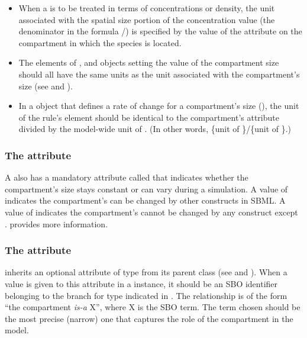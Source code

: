 \begin{itemize}
\item When a \Species is to be treated in terms of concentrations
  or density, the unit associated with the spatial size portion of
  the concentration value (\ie the denominator in the
  formula /) is specified by the
  value of the  attribute on the compartment in which
  the species is located.

\item The  elements of \AssignmentRule,
  \InitialAssignment and \EventAssignment objects setting the
  value of the compartment size should all have the same units as
  the unit associated with the compartment's size (see
  and ).

\item In a \RateRule object that defines a rate of change for a
  compartment's size (), the unit of the
  rule's  element should be identical to the
  compartment's  attribute divided by the model-wide
  unit of .  (In other words, \{unit of
  \}/\{unit of \}.)

\end{itemize}


\subsubsection{The  attribute}
\label{sec:compartment-constant}

A \Compartment also has a mandatory  attribute called
 that indicates whether the compartment's size
stays constant or can vary during a simulation.  A value of
 indicates the compartment's  can be
changed by other constructs in SBML.  A value of 
indicates the compartment's  cannot be changed by any
construct except \InitialAssignment.  
provides more information.


\subsubsection{The  attribute}
\label{sec:compartment-sboterm}

\Compartment inherits an optional 
attribute of type  from its parent
class \SBase (see 
and ).  When a value is given to this
attribute in a \Compartment instance, it should be an
SBO identifier belonging to the branch for type \Compartment 
indicated in .  The relationship is
of the form ``the compartment  \emph{is-a} X'', where X is
the SBO term.  The term chosen should be the most precise (narrow)
one that captures the role of the compartment in the model.

